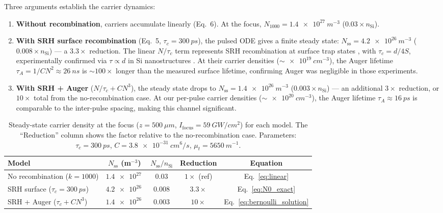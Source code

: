 \documentclass[11pt,a4paper]{article}
\begin{document}
Three arguments establish the carrier dynamics:

\begin{enumerate}
\item \textbf{Without recombination}, carriers accumulate linearly (Eq.~6). At the focus, $N_{1000} = \SI{1.4e27}{m^{-3}}$ ($0.03 \times n_\text{Si}$).

\item \textbf{With SRH surface recombination} (Eq.~5, $\tau_c = \SI{300}{ps}$), the pulsed ODE gives a finite steady state: $N_\text{ss} = \SI{4.2e26}{m^{-3}}$ ($0.008 \times n_\text{Si}$) --- a $3.3\times$ reduction. The linear $N/\tau_c$ term represents SRH recombination at surface trap states \cite{li_textbook}, with $\tau_c = d/4S$, experimentally confirmed via $\tau \propto d$ in Si nanostructures \cite{grumstrup2014,li2023}. At their carrier densities (${\sim}\SI{e19}{cm^{-3}}$), the Auger lifetime $\tau_A = 1/CN^2 \approx \SI{26}{ns}$ is ${\sim}100\times$ longer than the measured surface lifetime, confirming Auger was negligible in those experiments.

\item \textbf{With SRH + Auger} ($N/\tau_c + CN^3$), the steady state drops to $N_\text{ss} = \SI{1.4e26}{m^{-3}}$ ($0.003 \times n_\text{Si}$) --- an additional $3\times$ reduction, or $10\times$ total from the no-recombination case. At our per-pulse carrier densities (${\sim}\SI{e20}{cm^{-3}}$), the Auger lifetime $\tau_A \approx \SI{16}{ps}$ is comparable to the inter-pulse spacing, making this channel significant.
\end{enumerate}

\begin{table}[h]
\centering
\begin{tabular}{@{}lcccc@{}}
\toprule
Model & $N_\text{ss}$ (m$^{-3}$) & $N_\text{ss} / n_\text{Si}$ & Reduction & Equation \\
\midrule
No recombination ($k=1000$) & $\SI{1.4e27}{}$ & $0.03$ & $1\times$ (ref) & Eq.~\eqref{eq:linear} \\
SRH surface ($\tau_c = \SI{300}{ps}$) & $\SI{4.2e26}{}$ & $0.008$ & $3.3\times$ & Eq.~\eqref{eq:N0_exact} \\
SRH + Auger ($\tau_c + CN^3$) & $\SI{1.4e26}{}$ & $0.003$ & $10\times$ & Eq.~\eqref{eq:bernoulli_solution} \\
\bottomrule
\end{tabular}
\caption{Steady-state carrier density at the focus ($z = \SI{500}{\mu m}$, $I_\text{focus} = \SI{59}{GW/cm^2}$) for each model. The ``Reduction'' column shows the factor relative to the no-recombination case. Parameters: $\tau_c = \SI{300}{ps}$, $C = \SI{3.8e-31}{cm^6/s}$, $\mu_t = \SI{5650}{m^{-1}}$.}
\end{table}
\end{document}
